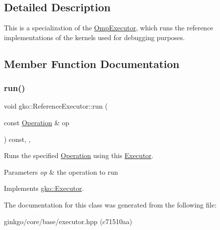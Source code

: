 \subsection{Detailed Description}
This is a specialization of the \hyperlink{classgko_1_1OmpExecutor}{Omp\+Executor}, which runs the reference implementations of the kernels used for debugging purposes. 

\subsection{Member Function Documentation}
\mbox{\label{classgko_1_1ReferenceExecutor_a82b41b42dbd26e8ac5b0146de79e5d34}} 
\subsubsection{\texorpdfstring{run()}{run()}}
{\footnotesize\ttfamily void gko\+::\+Reference\+Executor\+::run (\begin{DoxyParamCaption}\item[{const \hyperlink{classgko_1_1Operation}{Operation} \&}]{op }\end{DoxyParamCaption}) const\hspace{0.3cm}{\ttfamily [inline]}, {\ttfamily [override]}, {\ttfamily [virtual]}}



Runs the specified \hyperlink{classgko_1_1Operation}{Operation} using this \hyperlink{classgko_1_1Executor}{Executor}. 


\begin{DoxyParams}{Parameters}
{\em op} & the operation to run \\
\hline
\end{DoxyParams}


Implements \hyperlink{classgko_1_1Executor_a1de8e2668b76e66690acf5eef9e8324d}{gko\+::\+Executor}.



The documentation for this class was generated from the following file\+:\begin{DoxyCompactItemize}
\item 
ginkgo/core/base/executor.\+hpp (c71510aa)\end{DoxyCompactItemize}
